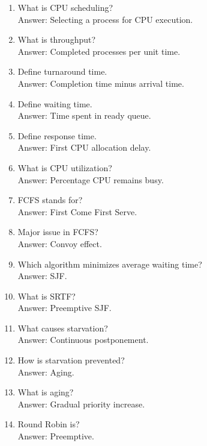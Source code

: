 \begin{enumerate}
\item What is CPU scheduling?\\
Answer: Selecting a process for CPU execution.

\item What is throughput?\\
Answer: Completed processes per unit time.

\item Define turnaround time.\\
Answer: Completion time minus arrival time.

\item Define waiting time.\\
Answer: Time spent in ready queue.

\item Define response time.\\
Answer: First CPU allocation delay.

\item What is CPU utilization?\\
Answer: Percentage CPU remains busy.

\item FCFS stands for?\\
Answer: First Come First Serve.

\item Major issue in FCFS?\\
Answer: Convoy effect.

\item Which algorithm minimizes average waiting time?\\
Answer: SJF.

\item What is SRTF?\\
Answer: Preemptive SJF.

\item What causes starvation?\\
Answer: Continuous postponement.

\item How is starvation prevented?\\
Answer: Aging.

\item What is aging?\\
Answer: Gradual priority increase.

\item Round Robin is?\\
Answer: Preemptive.


\end{enumerate}
